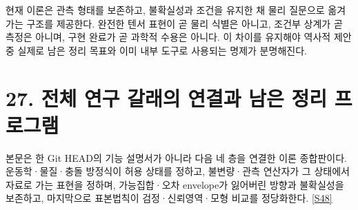 \documentclass[11pt,a4paper]{article}
\begin{document}
현재 이론은 관측 형태를 보존하고, 불확실성과 조건을 유지한 채 물리 질문으로 옮겨 가는 구조를 제공한다. 완전한 텐서 표현이 곧 물리 식별은 아니고, 조건부 상계가 곧 측정은 아니며, 구현 완료가 곧 과학적 수용은 아니다. 이 차이를 유지해야 역사적 제안 중 실제로 남은 정리 목표와 이미 내부 도구로 사용되는 명제가 분명해진다.


\hypertarget{s27}{}

\section*{27. 전체 연구 갈래의 연결과 남은 정리 프로그램}


본문은 한 Git HEAD의 기능 설명서가 아니라 다음 네 층을 연결한 이론 종합판이다. 운동학·물질·충돌 방정식이 허용 상태를 정하고, 불변량·관측 연산자가 그 상태에서 자료로 가는 표현을 정하며, 가능집합·오차 envelope가 잃어버린 방향과 불확실성을 보존하고, 마지막으로 표본법칙이 검정·신뢰영역·모형 비교를 정당화한다. \hyperlink{src:S48}{[S48]}
\end{document}
